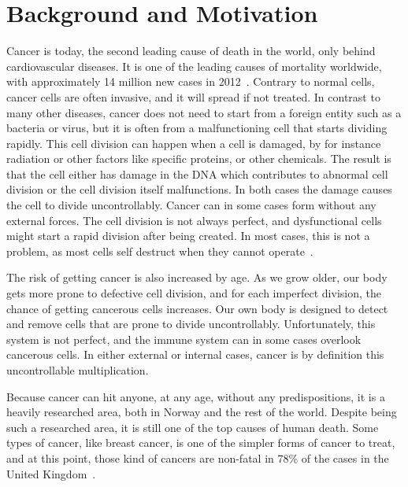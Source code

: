 \section{Background and Motivation}

Cancer is today, the second leading cause of death in the world, only behind cardiovascular diseases.  %
It is one of the leading causes of mortality worldwide, with approximately 14 million new cases in 2012~\cite{WHOCANCER}.
Contrary to normal cells, cancer cells are often invasive, and it will spread if not treated. 
In contrast to many other diseases, cancer does not need to start from a foreign entity such as a bacteria or virus, but it is often from a malfunctioning cell that starts dividing rapidly. 
This cell division can happen when a cell is damaged, by for instance radiation or other factors like specific proteins, or other chemicals. The result is that the cell either has damage in the DNA which contributes to abnormal cell division or the cell division itself malfunctions. In both cases the damage causes the cell to divide uncontrollably. 
Cancer can in some cases form without any external forces. The cell division is not always perfect, and dysfunctional cells might start a rapid division after being created. In most cases, this is not a problem, as most cells self destruct when they cannot operate~\cite{selfdestruction,apoptosis}. 

The risk of getting cancer is also increased by age. As we grow older, our body gets more prone to defective cell division, and for each imperfect division, the chance of getting cancerous cells increases.  
Our own body is designed to detect and remove cells that are prone to divide uncontrollably. Unfortunately, this system is not perfect, and the immune system can in some cases overlook cancerous cells.
In either external or internal cases, cancer is by definition this uncontrollable multiplication.




Because cancer can hit anyone, at any age, without any predispositions, it is a heavily researched area, both in Norway and the rest of the world. Despite being such a researched area, it is still one of the top causes of human death. 
Some types of cancer, like breast cancer, is one of the simpler forms of cancer to treat, and at this point, those kind of cancers are non-fatal in 78\% of the cases in the United Kingdom~\cite{UKCancer}. 
    
